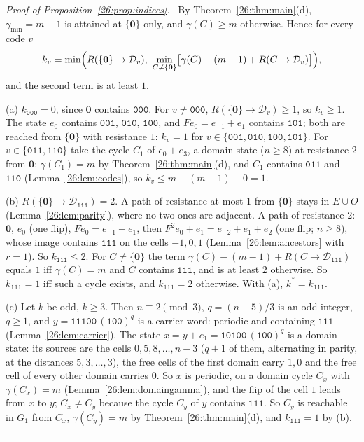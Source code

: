 \documentclass[10pt,a4paper]{article}
\newcommand{\qedmark}{\rule{1.1ex}{1.1ex}}
\newenvironment{proof}[1][Proof]{\par\smallskip\noindent\textit{#1.}\ }{\hfill\qedmark\par\smallskip}
\newcommand{\zero}{\mathbf{0}}                %
\newcommand{\gmin}{\gamma_{\min}}
\newcommand{\Gone}{G_1}                       %
\newcommand{\Dc}[1]{\mathcal{D}_{#1}}         %
\newcommand{\kst}{k^{*}}
\newcommand{\code}[1]{\mathtt{#1}}            %
\begin{document}
\begin{proof}[Proof of Proposition~\ref{26:prop:indices}]
By Theorem~\ref{26:thm:main}(d), $\gmin=m-1$ is attained at $\{\zero\}$ only, and $\gamma(C)\ge m$ otherwise. Hence
for every code $v$
\[
k_v=\min\Bigl(R(\{\zero\}\to\Dc{v}),\ \min_{C\ne\{\zero\}}\bigl[\gamma(C)-(m-1)+R(C\to\Dc{v})\bigr]\Bigr),
\]
and the second term is at least $1$.

(a) $k_{\code{000}}=0$, since $\zero$ contains $\code{000}$. For $v\ne\code{000}$, $R(\{\zero\}\to\Dc{v})\ge1$, so
$k_v\ge1$. The state $e_0$ contains $\code{001}$, $\code{010}$, $\code{100}$, and $Fe_0=e_{-1}+e_1$ contains
$\code{101}$; both are reached from $\{\zero\}$ with resistance $1$: $k_v=1$ for
$v\in\{\code{001},\code{010},\code{100},\code{101}\}$. For $v\in\{\code{011},\code{110}\}$ take the cycle $C_1$ of
$e_0+e_3$, a domain state ($n\ge8$) at resistance $2$ from $\zero$: $\gamma(C_1)=m$ by
Theorem~\ref{26:thm:main}(d), and $C_1$ contains $\code{011}$ and $\code{110}$ (Lemma~\ref{26:lem:codes}), so
$k_v\le m-(m-1)+0=1$.

(b) $R(\{\zero\}\to\Dc{\code{111}})=2$. A path of resistance at most $1$ from $\{\zero\}$ stays in $E\cup O$
(Lemma~\ref{26:lem:parity}), where no two ones are adjacent. A path of resistance $2$: $\zero$, $e_0$ (one flip),
$Fe_0=e_{-1}+e_1$, then $F^2e_0+e_1=e_{-2}+e_1+e_2$ (one flip; $n\ge8$), whose image contains $\code{111}$ on the
cells $-1,0,1$ (Lemma~\ref{26:lem:ancestors} with $r=1$). So $k_{\code{111}}\le2$. For $C\ne\{\zero\}$ the term
$\gamma(C)-(m-1)+R(C\to\Dc{\code{111}})$ equals $1$ iff $\gamma(C)=m$ and $C$ contains $\code{111}$, and is at
least $2$ otherwise. So $k_{\code{111}}=1$ iff such a cycle exists, and $k_{\code{111}}=2$ otherwise. With (a),
$\kst=k_{\code{111}}$.

(c) Let $k$ be odd, $k\ge3$. Then $n\equiv2\pmod 3$, $q=(n-5)/3$ is an odd integer, $q\ge1$, and
$y=\code{11100}\,(\code{100})^{q}$ is a carrier word: periodic and containing $\code{111}$
(Lemma~\ref{26:lem:carrier}). The state $x=y+e_1=\code{10100}\,(\code{100})^{q}$ is a domain state: its sources are
the cells $0,5,8,\dots,n-3$ ($q+1$ of them, alternating in parity, at the distances $5,3,\dots,3$), the free cells
of the first domain carry $1,0$ and the free cell of every other domain carries $0$. So $x$ is periodic, on a
domain cycle $C_x$ with $\gamma(C_x)=m$ (Lemma~\ref{26:lem:domaingamma}), and the flip of the cell $1$ leads from
$x$ to $y$; $C_x\ne C_y$ because the cycle $C_y$ of $y$ contains $\code{111}$. So $C_y$ is reachable in $\Gone$
from $C_x$, $\gamma(C_y)=m$ by Theorem~\ref{26:thm:main}(d), and $k_{\code{111}}=1$ by (b).
\end{proof}
\end{document}
